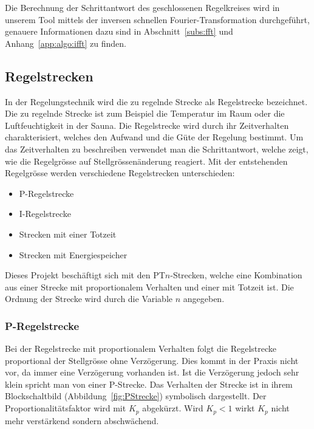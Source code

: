 Die  Berechnung   der  Schrittantwort  des  geschlossenen   Regelkreises  wird
in  unserem   Tool  mittels  der  inversen   schnellen  Fourier-Transformation
durchgef\"uhrt, genauere  Informationen dazu sind  in Abschnitt~\ref{subs:fft}
und Anhang~\ref{app:algo:ifft} zu finden.


\subsection{Regelstrecken}

In  der  Regelungstechnik  wird  die  zu  regelnde  Strecke  als  Regelstrecke
bezeichnet. Die  zu   regelnde  Strecke   ist  zum  Beispiel   die  Temperatur
im  Raum  oder  die  Luftfeuchtigkeit  in  der  Sauna. Die  Regelstrecke  wird
durch  ihr   Zeitverhalten  charakterisiert,  welches  den   Aufwand  und  die
G\"ute   der   Regelung   bestimmt. Um  das   Zeitverhalten   zu   beschreiben
verwendet  man die  Schrittantwort,  welche zeigt,  wie  die Regelgr\"osse auf
Stellgr\"ossen\"anderung reagiert. Mit  der entstehenden  Regelgr\"osse werden
verschiedene Regelstrecken unterschieden:

\begin{itemize}
    \item
        P-Regelstrecke
    \item
        I-Regelstrecke
    \item
        Strecken mit einer Totzeit
    \item
        Strecken mit Energiespeicher
\end{itemize}

Dieses  Projekt  besch\"aftigt  sich   mit  den  PT$n$-Strecken,  welche  eine
Kombination  aus einer  Strecke  mit proportionalem  Verhalten  und einer  mit
Totzeit ist. Die Ordnung der Strecke wird durch die Variable $n$ angegeben.


\subsubsection*{P-Regelstrecke}
Bei  der  Regelstrecke mit  proportionalem  Verhalten  folgt die  Regelstrecke
proportional der  Stellgr\"osse ohne  Verz\"ogerung. Dies kommt in  der Praxis
nicht vor,  da immer eine  Verz\"ogerung vorhanden ist. Ist  die Verz\"ogerung
jedoch  sehr  klein  spricht  man   von  einer  P-Strecke. Das  Verhalten  der
Strecke ist in ihrem Blockschaltbild (Abbildung~\ref{fig:PStrecke}) symbolisch
dargestellt. Der  Proportionalit\"atsfaktor wird  mit $K_p$  abgek\"urzt. Wird
$K_p<1$ wirkt $K_p$ nicht mehr verst\"arkend sondern abschw\"achend.

